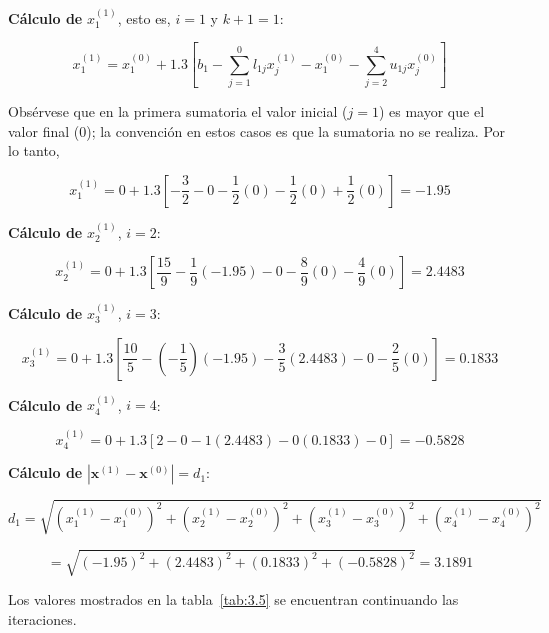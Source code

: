 \documentclass[12pt,letterpaper]{article}
\theoremstyle{definition}
\theoremstyle{plain}
\theoremstyle{remark}
\begin{document}
\textbf{Cálculo de } $x_1^{(1)}$, esto es, $i = 1$ y $k+1 = 1$:

\[
x_1^{(1)} = x_1^{(0)} + 1.3 \left[ b_1 - \sum_{j=1}^{0} l_{1j} x_j^{(1)} - x_1^{(0)} - \sum_{j=2}^{4} u_{1j} x_j^{(0)} \right]
\]

Obsérvese que en la primera sumatoria el valor inicial ($j=1$) es mayor que el valor final ($0$); la convención en estos casos es que la sumatoria no se realiza. Por lo tanto,

\[
x_1^{(1)} = 0 + 1.3 \left[ -\frac{3}{2} - 0 - \frac{1}{2}(0) - \frac{1}{2}(0) + \frac{1}{2}(0) \right] = -1.95
\]

\textbf{Cálculo de } $x_2^{(1)}$, $i = 2$:

\[
x_2^{(1)} = 0 + 1.3 \left[ \frac{15}{9} - \frac{1}{9}(-1.95) - 0 - \frac{8}{9}(0) - \frac{4}{9}(0) \right] = 2.4483
\]

\textbf{Cálculo de } $x_3^{(1)}$, $i = 3$:

\[
x_3^{(1)} = 0 + 1.3 \left[ \frac{10}{5} - (-\frac{1}{5})(-1.95) - \frac{3}{5}(2.4483) - 0 - \frac{2}{5}(0) \right] = 0.1833
\]

\textbf{Cálculo de } $x_4^{(1)}$, $i = 4$:

\[
x_4^{(1)} = 0 + 1.3 \left[ 2 - 0 - 1(2.4483) - 0(0.1833) - 0 \right] = -0.5828
\]

\textbf{Cálculo de } $|\mathbf{x}^{(1)} - \mathbf{x}^{(0)}| = d_1$:

\[
d_1 = \sqrt{(x_1^{(1)} - x_1^{(0)})^2 + (x_2^{(1)} - x_2^{(0)})^2 + (x_3^{(1)} - x_3^{(0)})^2 + (x_4^{(1)} - x_4^{(0)})^2}
\]

\[
= \sqrt{(-1.95)^2 + (2.4483)^2 + (0.1833)^2 + (-0.5828)^2} = 3.1891
\]

Los valores mostrados en la tabla~\ref{tab:3.5} se encuentran continuando las iteraciones.
\end{document}
